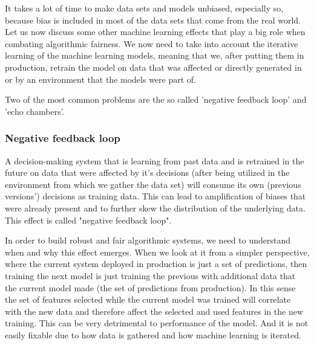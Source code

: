 It takes a lot of time to make data sets and models unbiased, especially so, because bias is included in most of the  data sets that come from the real world. Let us now discuss some other machine learning effects that play a big role when combating algorithmic fairness. We now need to take into account the iterative learning of the machine learning models, meaning that we, after putting them in production, retrain the model on data that was affected or directly generated in or by an environment that the models were part of.

Two of the most common problems are the so called 'negative feedback loop' and 'echo chambers'. 


\subsubsection{Negative feedback loop}

A decision-making system that is learning from past data and is retrained in the future on data that were affected by it's decisions  (after being utilized in the environment from which we gather the data set) will consume its own (previous versions') decisions as training data. This can lead to amplification of biases that were already present and to further skew the distribution of the underlying data. This effect is called "negative feedback loop". 


In order to build robust and fair algorithmic systems, we need to understand when and why this effect emerges. When we look at it from a simpler perspective, where the current system deployed in production is just a set of predictions, then training the next model is just training the previous with additional data that the current model made (the set of predictions from production). In this sense the set of features selected while the current model was trained will correlate with the new data and therefore affect the selected and used features in the new training. This can be very detrimental to performance of the model. And it is not easily fixable due to how data is gathered and how machine learning is iterated.

